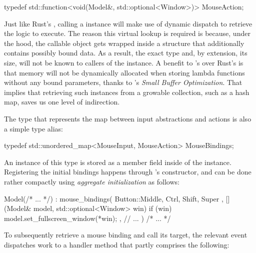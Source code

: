\begin{cppblock}
  typedef
    std::function<void(Model&, std::optional<Window>)>
    MouseAction;
\end{cppblock}

Just like Rust's , calling a  instance will
make use of dynamic dispatch to retrieve the logic to execute\cite{cppstd}.
The reason this virtual lookup is required is because, under the hood, the
callable object gets wrapped inside a structure that additionally contains
possibly bound data\cite{cppstd}. As a result, the exact type and, by
extension, its size, will not be known to callers of the 
instance\cite{underhoodfunction}. A benefit to \cpp{}'s 
over Rust's  is that memory will not be dynamically allocated when
storing lambda functions without any bound parameters, thanks to \cpp{}'s
\textit{Small Buffer Optimization}\cite{commonoptimizations, underhoodfunction}.
That implies that retrieving such instances from a growable collection, such as
a hash map, saves us one level of indirection.

The  type that represents the map between input
abstractions and actions is also a simple type alias:

\begin{cppblock}
  typedef
    std::unordered_map<MouseInput, MouseAction>
    MouseBindings;
\end{cppblock}

An instance of this type is stored as a member field inside of the 
instance. Registering the initial bindings happens through 's
constructor, and can be done rather compactly using \textit{aggregate
initialization} as follows\cite{stdcpp}:

\begin{cppblock}
  Model(/* ... */)
    : mouse_bindings({
      { { Button::Middle, { Ctrl, Shift, Super } },
        [](Model& model, std::optional<Window> win) {
          if (win) model.set_fullscreen_window(*win);
        }
      },
      // ...
    })
  { /* ... */ }
\end{cppblock}

To subsequently retrieve a mouse binding and call its target, the relevant
 event dispatches work to a handler method that partly
comprises the following:

\begin{cppblock}
  void
  Model::handle_mouse(MouseEvent& event)
  {
    MouseBindings& mb = this->mouse_bindings;
\end{cppblock}
\begin{cppblock}
    if (mb.find(event.input) != mb.end())
      mb.at(event.input)(*this, event.window);
  }
\end{cppblock}

